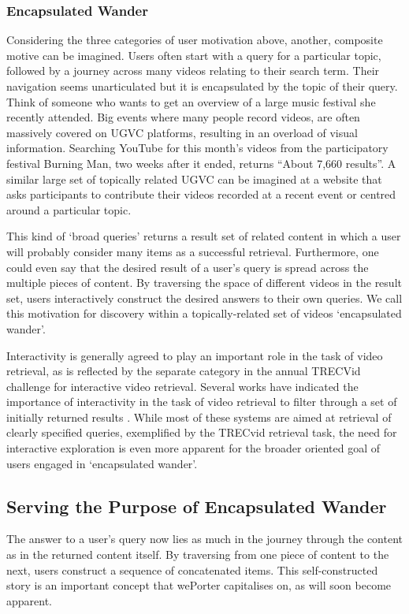 \subsubsection{Encapsulated Wander}

Considering the three categories of user motivation above, another, composite motive can be imagined. Users often start with a query for a particular topic, followed by a journey across many videos relating to their search term. Their navigation seems unarticulated but it is encapsulated by the topic of their query. Think of someone who wants to get an overview of a large music festival she recently attended. Big events where many people record videos, are often massively covered on UGVC platforms, resulting in an overload of visual information. Searching YouTube for this month's videos from the participatory festival Burning Man, two weeks after it ended, returns ``About 7,660 results''\cite{youtubeBM}. A similar large set of topically related UGVC can be imagined at a website that asks participants to contribute their videos recorded at a recent event or centred around a particular topic.

This kind of `broad queries' returns a result set of related content in which a user will probably consider many items as a successful retrieval. Furthermore, one could even say that the desired result of a user's query is spread across the multiple pieces of content. By traversing the space of different videos in the result set, users interactively construct the desired answers to their own queries. We call this motivation for discovery within a topically-related set of videos `encapsulated wander'.

Interactivity is generally agreed to play an important role in the task of video retrieval, as is reflected by the separate category in the annual TRECVid challenge for interactive video retrieval\cite{Smeaton:2006ww}. Several works have indicated the importance of interactivity in the task of video retrieval to filter through a set of initially returned results \cite{DeRooij:2007ua, Christel:2004wm, DeRooij:2007ua, DeRooij:2008ut}. While most of these systems are aimed at retrieval of clearly specified queries, exemplified by the TRECvid retrieval task, the need for interactive exploration is even more apparent for the broader oriented goal of users engaged in `encapsulated wander'.

\subsection{Serving the Purpose of Encapsulated Wander}
The answer to a user's query now lies as much in the journey through the content as in the returned content itself. By traversing from one piece of content to the next, users construct a sequence of concatenated items. This self-constructed story is an important concept that wePorter capitalises on, as will soon become apparent.


